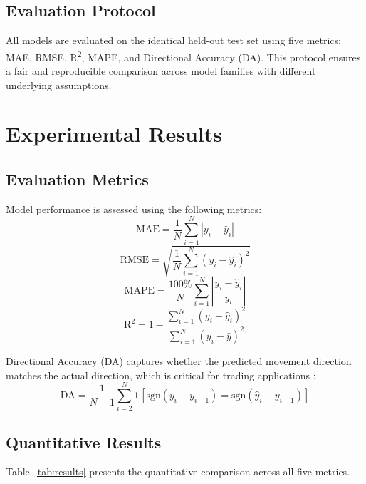\documentclass[journal,comsoc]{IEEEtran}
\begin{document}
\subsection{Evaluation Protocol}
All models are evaluated on the identical held-out test set using five metrics: MAE, RMSE, R\textsuperscript{2}, MAPE, and Directional Accuracy (DA). This protocol ensures a fair and reproducible comparison across model families with different underlying assumptions.

\section{Experimental Results}

\subsection{Evaluation Metrics}
Model performance is assessed using the following metrics:
\begin{equation}
    \text{MAE} = \frac{1}{N} \sum_{i=1}^{N} |y_i - \hat{y}_i|
\end{equation}
\begin{equation}
    \text{RMSE} = \sqrt{\frac{1}{N} \sum_{i=1}^{N} (y_i - \hat{y}_i)^2}
\end{equation}
\begin{equation}
    \text{MAPE} = \frac{100\%}{N} \sum_{i=1}^{N} \left| \frac{y_i - \hat{y}_i}{y_i} \right|
\end{equation}
\begin{equation}
    \text{R}^2 = 1 - \frac{\sum_{i=1}^{N}(y_i - \hat{y}_i)^2}{\sum_{i=1}^{N}(y_i - \bar{y})^2}
\end{equation}

Directional Accuracy (DA) captures whether the predicted movement direction matches the actual direction, which is critical for trading applications \cite{b14}:
\begin{equation}
    \text{DA} = \frac{1}{N-1} \sum_{i=2}^{N} \mathbf{1}\!\left[\text{sgn}(y_i - y_{i-1}) = \text{sgn}(\hat{y}_i - y_{i-1})\right]
\end{equation}

\subsection{Quantitative Results}
Table~\ref{tab:results} presents the quantitative comparison across all five metrics.
\end{document}
